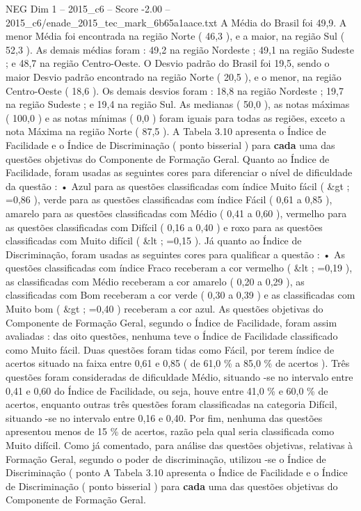 \begin{textsample}{NEG Dim 1 – 2015\_c6 – Score -2.00 – 2015\_c6/enade\_2015\_tec\_mark\_6b65a1aace.txt}
A Média do Brasil foi 49,9.
A menor Média foi encontrada na região Norte ( 46,3 ), e a maior, na região Sul ( 52,3 ).
As demais médias foram : 49,2 na região Nordeste ; 49,1 na região Sudeste ; e 48,7 na região Centro-Oeste.
O Desvio padrão do Brasil foi 19,5, sendo o maior Desvio padrão encontrado na região Norte ( 20,5 ), e o menor, na região Centro-Oeste ( 18,6 ).
Os demais desvios foram : 18,8 na região Nordeste ; 19,7 na região Sudeste ; e 19,4 na região Sul.
As medianas ( 50,0 ), as notas máximas ( 100,0 ) e as notas mínimas ( 0,0 ) foram iguais para todas as regiões, exceto a nota Máxima na região Norte ( 87,5 ).
A Tabela 3.10 apresenta o Índice de Facilidade e o Índice de Discriminação ( ponto bisserial ) para \textbf{cada} uma das questões objetivas do Componente de Formação Geral.
Quanto ao Índice de Facilidade, foram usadas as seguintes cores para diferenciar o nível de dificuldade da questão : • Azul para as questões classificadas com índice Muito fácil ( \&gt ; =0,86 ), verde para as questões classificadas com índice Fácil ( 0,61 a 0,85 ), amarelo para as questões classificadas com Médio ( 0,41 a 0,60 ), vermelho para as questões classificadas com Difícil ( 0,16 a 0,40 ) e roxo para as questões classificadas com Muito difícil ( \&lt ; =0,15 ).
Já quanto ao Índice de Discriminação, foram usadas as seguintes cores para qualificar a questão : • As questões classificadas com índice Fraco receberam a cor vermelho ( \&lt ; =0,19 ), as classificadas com Médio receberam a cor amarelo ( 0,20 a 0,29 ), as classificadas com Bom receberam a cor verde ( 0,30 a 0,39 ) e as classificadas com Muito bom ( \&gt ; =0,40 ) receberam a cor azul.
As questões objetivas do Componente de Formação Geral, segundo o Índice de Facilidade, foram assim avaliadas : das oito questões, nenhuma teve o Índice de Facilidade classificado como Muito fácil.
Duas questões foram tidas como Fácil, por terem índice de acertos situado na faixa entre 0,61 e 0,85 ( de 61,0 \% a 85,0 \% de acertos ).
Três questões foram consideradas de dificuldade Médio, situando -se no intervalo entre 0,41 e 0,60 do Índice de Facilidade, ou seja, houve entre 41,0 \% e 60,0 \% de acertos, enquanto outras três questões foram classificadas na categoria Difícil, situando -se no intervalo entre 0,16 e 0,40.
Por fim, nenhuma das questões apresentou menos de 15 \% de acertos, razão pela qual seria classificada como Muito difícil.
Como já comentado, para análise das questões objetivas, relativas à Formação Geral, segundo o poder de discriminação, utilizou -se o Índice de Discriminação ( ponto A Tabela 3.10 apresenta o Índice de Facilidade e o Índice de Discriminação ( ponto bisserial ) para \textbf{cada} uma das questões objetivas do Componente de Formação Geral.

\end{textsample}

